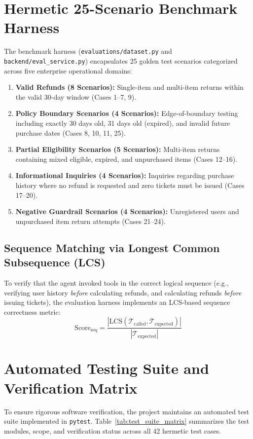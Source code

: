 \section{Hermetic 25-Scenario Benchmark Harness}
\label{sec:impl_benchmark_harness}
The benchmark harness (\texttt{evaluations/dataset.py} and \texttt{backend/eval\_service.py}) encapsulates 25 golden test scenarios categorized across five enterprise operational domains:
\begin{enumerate}
    \item \textbf{Valid Refunds (8 Scenarios):} Single-item and multi-item returns within the valid 30-day window (Cases 1--7, 9).
    \item \textbf{Policy Boundary Scenarios (4 Scenarios):} Edge-of-boundary testing including exactly 30 days old, 31 days old (expired), and invalid future purchase dates (Cases 8, 10, 11, 25).
    \item \textbf{Partial Eligibility Scenarios (5 Scenarios):} Multi-item returns containing mixed eligible, expired, and unpurchased items (Cases 12--16).
    \item \textbf{Informational Inquiries (4 Scenarios):} Inquiries regarding purchase history where no refund is requested and zero tickets must be issued (Cases 17--20).
    \item \textbf{Negative Guardrail Scenarios (4 Scenarios):} Unregistered users and unpurchased item return attempts (Cases 21--24).
\end{enumerate}

\subsection{Sequence Matching via Longest Common Subsequence (LCS)}
To verify that the agent invoked tools in the correct logical sequence (e.g., verifying user history \textit{before} calculating refunds, and calculating refunds \textit{before} issuing tickets), the evaluation harness implements an LCS-based sequence correctness metric:
\begin{equation}
    \text{Score}_{\text{seq}} = \frac{|\text{LCS}(\mathcal{T}_{\text{called}}, \mathcal{T}_{\text{expected}})|}{|\mathcal{T}_{\text{expected}}|}
\end{equation}

\section{Automated Testing Suite and Verification Matrix}
\label{sec:impl_testing}
To ensure rigorous software verification, the project maintains an automated test suite implemented in \texttt{pytest}. Table~\ref{tab:test_suite_matrix} summarizes the test modules, scope, and verification status across all 42 hermetic test cases.

